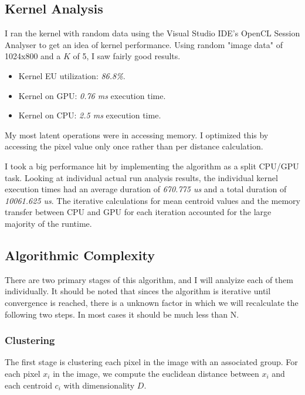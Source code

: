 \documentclass[11pt]{article}
\begin{document}
\subsection{Kernel Analysis}

I ran the kernel with random data using the Visual Studio IDE's OpenCL Session Analyser to get
an idea of kernel performance. Using random "image data" of 1024x800 and a $K$ of 5, I saw
fairly good results.

\begin{itemize}
\item Kernel EU utilization: \emph{86.8\%}.
\item Kernel on GPU: \emph{0.76 ms} execution time.
\item Kernel on CPU: \emph{2.5 ms} execution time.
\end{itemize}

My most latent operations were in accessing memory. I optimized this by accessing the pixel value
only once rather than per distance calculation.

I took a big performance hit by implementing the algorithm as a split CPU/GPU task. Looking
at individual actual run analysis results, the individual kernel execution times had an average
duration of \emph{670.775 us} and a total duration of \emph{10061.625 us}. The iterative
calculations for mean centroid values and the memory transfer between CPU and GPU for each
iteration accounted for the large majority of the runtime.

\subsection{Algorithmic Complexity}

There are two primary stages of this algorithm, and I will analyize each of them individually.
It should be noted that sinces the algorithm is iterative until convergence is reached, there
is a unknown factor in which we will recalculate the following two steps. In most cases it
should be much less than N.

\subsubsection{Clustering}

The first stage is clustering each pixel in the image with an associated group. For
each pixel $x_i$ in the image, we compute the euclidean distance between $x_i$
and each centroid $c_i$ with dimensionality $D$.
\end{document}

